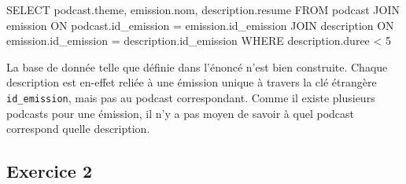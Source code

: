 \documentclass[
  letterpaper,
  DIV=11,
  numbers=noendperiod]{scrartcl}
\newenvironment{Shaded}{\begin{snugshade}}{\end{snugshade}}
\newcommand{\DecValTok}[1]{\textcolor[rgb]{0.68,0.00,0.00}{#1}}
\newcommand{\KeywordTok}[1]{\textcolor[rgb]{0.00,0.23,0.31}{#1}}
\newcommand{\NormalTok}[1]{\textcolor[rgb]{0.00,0.23,0.31}{#1}}
\newcommand{\OperatorTok}[1]{\textcolor[rgb]{0.37,0.37,0.37}{#1}}
\begin{document}
\begin{enumerate}
\begin{Shaded}
\begin{Highlighting}[]
\KeywordTok{SELECT}\NormalTok{ podcast.theme, emission.nom, description.}\KeywordTok{resume}
\KeywordTok{FROM}\NormalTok{ podcast}
\KeywordTok{JOIN}\NormalTok{ emission }\KeywordTok{ON}\NormalTok{ podcast.id\_emission }\OperatorTok{=}\NormalTok{ emission.id\_emission}
\KeywordTok{JOIN}\NormalTok{ description }\KeywordTok{ON}\NormalTok{ emission.id\_emission }\OperatorTok{=}\NormalTok{ description.id\_emission}
\KeywordTok{WHERE}\NormalTok{ description.duree }\OperatorTok{\textless{}} \DecValTok{5}
\end{Highlighting}
\end{Shaded}
\end{enumerate}

\begin{tcolorbox}[enhanced jigsaw, leftrule=.75mm, coltitle=black, bottomrule=.15mm, colframe=quarto-callout-important-color-frame, titlerule=0mm, colbacktitle=quarto-callout-important-color!10!white, opacitybacktitle=0.6, toptitle=1mm, breakable, bottomtitle=1mm, title=\textcolor{quarto-callout-important-color}{\faExclamation}\hspace{0.5em}{Important}, rightrule=.15mm, opacityback=0, toprule=.15mm, left=2mm, colback=white, arc=.35mm]

La base de donnée telle que définie dans l'énoncé n'est bien construite.
Chaque description est en-effet reliée à une émission unique à travers
la clé étrangère \texttt{id\_emission}, mais pas au podcast
correspondant. Comme il existe plusieurs podcasts pour une émission, il
n'y a pas moyen de savoir à quel podcast correspond quelle description.

\end{tcolorbox}

\hypertarget{exercice-2}{%
\subsection{Exercice 2}\label{exercice-2}}
\end{document}
